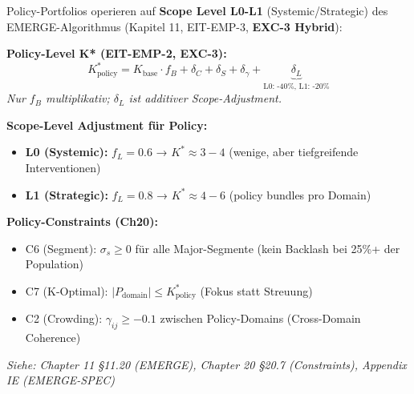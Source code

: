 \begin{tcolorbox}[colback=blue!5!white, colframe=blue!75!black,
    title=\textbf{Cross-Reference: EMERGE Algorithm \& Policy-Level K* (Chapter 11, 20)}]

Policy-Portfolios operieren auf \textbf{Scope Level L0-L1} (Systemic/Strategic) des EMERGE-Algorithmus (Kapitel 11, EIT-EMP-3, \textbf{EXC-3 Hybrid}):

\vspace{0.2cm}
\textbf{Policy-Level K* (EIT-EMP-2, EXC-3):}
\begin{equation*}
K^*_{\text{policy}} = K_{\text{base}} \cdot f_B + \delta_C + \delta_S + \delta_\gamma + \underbrace{\delta_L}_{\text{L0: -40\%, L1: -20\%}}
\end{equation*}
\textit{Nur $f_B$ multiplikativ; $\delta_L$ ist additiver Scope-Adjustment.}

\textbf{Scope-Level Adjustment für Policy:}
\begin{itemize}[nosep]
\item \textbf{L0 (Systemic):} $f_L = 0.6$ → $K^* \approx 3-4$ (wenige, aber tiefgreifende Interventionen)
\item \textbf{L1 (Strategic):} $f_L = 0.8$ → $K^* \approx 4-6$ (policy bundles pro Domain)
\end{itemize}

\vspace{0.2cm}
\textbf{Policy-Constraints (Ch20):}
\begin{itemize}[nosep]
\item C6 (Segment): $\sigma_s \geq 0$ für alle Major-Segmente (kein Backlash bei 25\%+ der Population)
\item C7 (K-Optimal): $|P_{\text{domain}}| \leq K^*_{\text{policy}}$ (Fokus statt Streuung)
\item C2 (Crowding): $\gamma_{ij} \geq -0.1$ zwischen Policy-Domains (Cross-Domain Coherence)
\end{itemize}

\vspace{0.2cm}
\textit{Siehe: Chapter 11 §11.20 (EMERGE), Chapter 20 §20.7 (Constraints), Appendix IE (EMERGE-SPEC)}
\end{tcolorbox}


